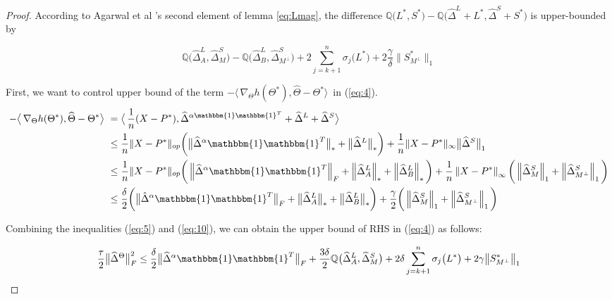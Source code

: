 \documentclass[AMS,STIX1COL]{WileyNJD-v2}
\begin{document}
{\begin{proof}
According to Agarwal et al \cite{agarwal2012noisy}'s second element of lemma \ref{eq:Lmag},
the difference $\mathbb{Q}\big(L^*,S^*\big)- \mathbb{Q}\big(\widehat{\Delta}^L + L^{*},\widehat{\Delta}^S + S^{*}\big)$ is upper-bounded by

\begin{equation}\label{eq:5}
    \mathbb{Q}\big(\widehat{\Delta}^L_{A},\widehat{\Delta}^S_{M}\big) - \mathbb{Q}\big(\widehat{\Delta}^L_{B},\widehat{\Delta}^S_{M^\perp}\big)
    +2 \sum_{j=k+1}^{n} \sigma_{j}\big(L^*\big) + 2\frac{\gamma}{\delta}\big\|S^*_{M^\perp}\big\|_{1}
\end{equation}

First, we want to control upper bound of the term $-\big\langle\,\nabla_{\Theta}h(\Theta^{*}),\widehat{\Theta}-\Theta^{*} \big\rangle\,$
in (\ref{eq:4}).
\begin{align}
-\big\langle\,\nabla_{\Theta}h(\Theta^{*}),\widehat{\Theta}-\Theta^{*} \big\rangle\  \nonumber
&=\big\langle\, \frac{1}{n} (X - P^*), \widehat\Delta^{\alpha\mathbbm{1}\mathbbm{1}^T} + \widehat\Delta^{L} + \widehat\Delta^{S} \big\rangle\ \\ \nonumber
&\leq \frac{1}{n} \|X - P^*\|_{op}\bigg(\big\|\widehat{\Delta}^{\alpha}\mathbbm{1}\mathbbm{1}^T\big\|_\ast + \big\|\widehat{\Delta}^{L}\big\|_\ast\bigg) +  \frac{1}{n} \|X - P^*\|_{\infty}\big\|\widehat{\Delta}^{S}\big\|_{1} \\ \nonumber
&\leq \frac{1}{n} \|X - P^*\|_{op}\bigg(\left\|\widehat{\Delta}^{\alpha}\mathbbm{1}\mathbbm{1}^T\right\|_{F} + \left\|\widehat{\Delta}^{L}_{A}\right\|_\ast + \left\|\widehat{\Delta}^{L}_{B}\right\|_\ast\bigg) +
\frac{1}{n} \left\|X - P^*\right\|_{\infty}\bigg(\left\|\widehat{\Delta}^{S}_{M}\right\|_{1} +
\left\|\widehat{\Delta}^{S}_{M^{\perp}}\right\|_{1}\bigg) \\
&\leq \frac{\delta}{2}\bigg(\big\|\hat{\Delta}^{\alpha}\mathbbm{1}\mathbbm{1}^T\big\|_{F} + \big\|\widehat{\Delta}^{L}_{A}\big\|_\ast + \big\|\widehat{\Delta}^{L}_{B}\big\|_\ast\bigg) + \frac{\gamma}{2}\bigg(\left\|\widehat{\Delta}^{S}_{M}\right\|_{1} +
\left\|\widehat{\Delta}^{S}_{M^{\perp}}\right\|_{1}\bigg)  \label{eq:10}
\end{align}

Combining the inequalities (\ref{eq:5}) and (\ref{eq:10}), we can obtain the upper bound of RHS in (\ref{eq:4}) as follows:

\begin{equation}
    \frac{\tau}{2}\big\|\widehat{\Delta}^{\Theta}\big\|_{F}^{2} \leq
    \frac{\delta}{2}\big\|\widehat{\Delta}^{\alpha}\mathbbm{1}\mathbbm{1}^T\big\|_{F} +
    \frac{3\delta}{2}\mathbb{Q}\big(\widehat{\Delta}^L_{A},\widehat{\Delta}^S_{M}\big)
    +2 \delta \sum_{j=k+1}^{n} \sigma_{j}\big(L^*\big) + 2\gamma \big\|S^*_{M^\perp}\big\|_{1}
    \label{eq:11}
\end{equation}


\end{proof}}
\end{document}

